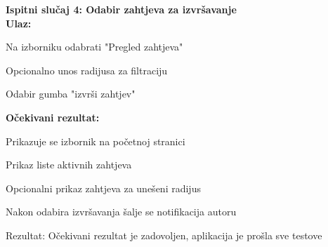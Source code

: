         \noindent \textbf{Ispitni slučaj 4: Odabir zahtjeva za izvršavanje}\\
			 \medskip
            \noindent\textbf{Ulaz:}
            \begin{packed_enum}
            \item  Na izborniku odabrati "Pregled zahtjeva"
            \item Opcionalno unos radijusa za filtraciju
            \item Odabir gumba "izvrši zahtjev"
            \end{packed_enum}
            
            \noindent\textbf{Očekivani rezultat:}
            \begin{packed_enum}
            \item Prikazuje se izbornik na početnoj stranici
            \item Prikaz  liste aktivnih zahtjeva
            \item Opcionalni prikaz zahtjeva za unešeni radijus
            \item Nakon odabira izvršavanja šalje se notifikacija autoru
            \end{packed_enum}
            
            \noindent \text
            Rezultat: Očekivani rezultat je zadovoljen, aplikacija je prošla sve testove \\  
            
